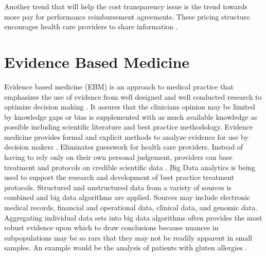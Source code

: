\documentclass[sigconf]{acmart}
\begin{document}
Another trend that will help the cost transparency issue is the trend towards more pay for performance reimbursement agreements. These pricing structure encourages health care providers to share information \cite{www-google-christian}. 

\section{Evidence Based Medicine}
Evidence based medicine (EBM) is an approach to medical practice that emphasizes the use of evidence from well designed and well conducted research to optimize decision making \cite{www-google-wikievi}.  It assures that the clinicians opinion may be limited by knowledge gaps or bias is supplemented with as much available knowledge as possible including scientific literature and best practice methodology. Evidence medicine provides formal and explicit methods to analyze evidence for use by decision makers \cite{www-google-wikievi}.  Eliminates guesswork for health care providers. Instead of having to rely only on their own personal judgement, providers can base treatment and protocols on credible scientific data \cite{www-google-christian}.
Big Data analytics is being used to support the research and development of best practice treatment protocols.  Structured and unstructured data from a variety of sources is combined and big data algorithms are applied. Sources may include electronic medical records, financial and operational data, clinical data, and genomic data. Aggregating individual data sets into big data algorithms often provides the most robust evidence upon which to draw conclusions because nuances in subpopulations may be so rare that they may not be readily apparent in small samples. An example would be the analysis of patients with gluten allergies \cite{www-google-McKinsey}.
 
\end{document}
